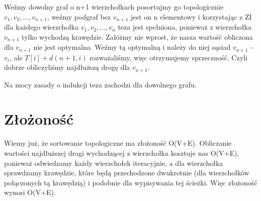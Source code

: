 \documentclass[12pt,a4paper]{article}
\begin{document}
Weźmy dowolny graf o n+1 wierzchołkach posortujmy go topologicznie $v_1, v_2, ..., v_{n+1}$, weźmy podgraf bez $v_{n+1}$ jest on n elementowy i korzystając z ZI dla każdego wierzchołka $v_1, v_2, ..., v_n$ teza jest spełniona, ponieważ z wierzchołka $v_{n+1}$ tylko wychodzą krawędzie. Załóżmy nie wprost, że nasza wartość obliczona dla $v_{n+1}$ nie jest optymalna. Weźmy tą optymalną i należy do niej sąsiad $v_{n+1}$ - $v_i$, ale $T[i] + d(n+1, i)$ rozważaliśmy, więc otrzymujemy sprzeczność. Czyli dobrze obliczyliśmy najdłuższą drogę dla $v_{n+1}$.

Na mocy zasady o indukcji teza zachodzi dla dowolnego grafu.

\section{Złożoność}
Wiemy już, że sortowanie topologiczne ma złożoność O(V+E). Obliczanie wartości najdłuższej drogi wychodzącej z wierzchołka kosztuje nas O(V+E), ponieważ odwiedzamy każdy wierzchołek iteracyjnie, a dla wierzchołka sprawdzamy krawędzie, które będą przechodzone dwukrotnie (dla wierzchołków połączonych tą krawędzią) i podobnie dla wypisywania tej ścieżki. Więc złożoność wynosi O(V+E).
\end{document}
